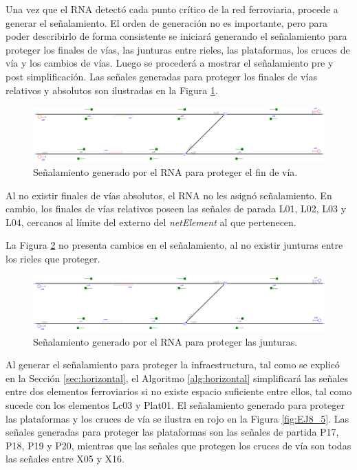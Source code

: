 	Una vez que el RNA detectó cada punto crítico de la red ferroviaria, procede a generar el señalamiento. El orden de generación no es importante, pero para poder describirlo de forma consistente se iniciará generando el señalamiento para proteger los finales de vías, las junturas entre rieles, las plataformas, los cruces de vía y los cambios de vías. Luego se procederá a mostrar el señalamiento pre y post simplificación. Las señales generadas para proteger los finales de vías relativos y absolutos son ilustradas en la Figura \ref{fig:EJ8_3}.
	
	\begin{figure}[H]
		\centering
		\includegraphics[width=1\textwidth]{resultados-obtenidos/ejemplo8/images/8_step1.png}
		\centering\caption{Señalamiento generado por el RNA para proteger el fin de vía.}
		\label{fig:EJ8_3}
	\end{figure}
	
	Al no existir finales de vías absolutos, el RNA no les asignó señalamiento. En cambio, los finales de vías relativos poseen las señales de parada L01, L02, L03 y L04, cercanos al límite del externo del \textit{netElement} al que pertenecen.
	
	La Figura \ref{fig:EJ8_4} no presenta cambios en el señalamiento, al no existir junturas entre los rieles que proteger.
	
	\begin{figure}[H]
		\centering
		\includegraphics[width=1\textwidth]{resultados-obtenidos/ejemplo8/images/8_step2.png}
		\centering\caption{Señalamiento generado por el RNA para proteger las junturas.}
		\label{fig:EJ8_4}
	\end{figure}
	
	Al generar el señalamiento para proteger la infraestructura, tal como se explicó en la Sección \ref{sec:horizontal}, el Algoritmo \ref{alg:horizontal} simplificará las señales entre dos elementos ferroviarios si no existe espacio suficiente entre ellos, tal como sucede con los elementos Lc03 y Plat01. El señalamiento generado para proteger las plataformas y los cruces de vía se ilustra en rojo en la Figura \ref{fig:EJ8_5}. Las señales generadas para proteger las plataformas son las señales de partida P17, P18, P19 y P20, mientras que las señales que protegen los cruces de vía son todas las señales entre X05 y X16.
	
